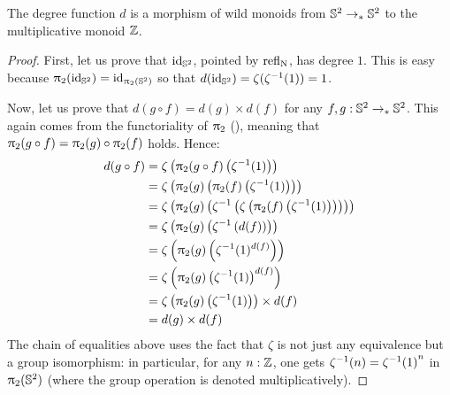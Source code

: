 \documentclass[english,a4paper]{lmcs}
\begin{document}
\begin{prop}
  The degree function $d$ is a morphism of wild monoids from ${{\mathbb S^{2}}} \to_\ast {{\mathbb S^{2}}}$
  to the multiplicative monoid $\mathbb{Z}$.
  \label{prop:deg-monoid-morphism}
\end{prop}
\begin{proof}
  First, let us prove that $\mathord{\mathrm{id}}_{{\mathbb S^{2}}}$, pointed by $\mathop{{\mathrm{refl}}_{\mathrm{N}}}$, has degree $1$.
  This is easy because $\uppi_{2}(\mathord{\mathrm{id}}_{{\mathbb S^{2}}}) = \mathord{\mathrm{id}}_{\uppi_{2}({{\mathbb S^{2}}})}$ so that $d(\mathord{\mathrm{id}}_{{\mathbb S^{2}}})
  = \zeta(\zeta^{-1}(1)) = 1$.

  Now, let us prove that $d(g\circ f) = d(g)\times d(f)$ for any $f,g:{{\mathbb S^{2}}}
  \to_\ast{{\mathbb S^{2}}}$. This again comes from the functoriality of $\uppi_{2}$
  (\cite[after Lem.\ 7.3.3 and before Def.\ 8.4.2]{HoTT}),
  meaning that $\uppi_{2}(g\circ f) = \uppi_{2}(g)\circ\uppi_{2}(f)$
  holds. Hence:
  \begin{align*}
    d(g\circ f) &= \zeta\left( \uppi_{2}(g\circ f)\left( \zeta^{-1}(1) \right) \right)
    \\
    &= \zeta\left( \uppi_{2}(g) \left( \uppi_{2}(f)\left( \zeta^{-1}(1) \right)
    \right) \right)
    \\
    &= \zeta\left( \uppi_{2}(g) \left( \zeta^{-1} \left( \zeta \left( \uppi_{2}(f)\left( \zeta^{-1}(1) \right)
    \right) \right) \right) \right)
    \\
    &= \zeta \left( \uppi_{2}(g) \left( \zeta^{-1} \left(d(f)\right) \right) \right)
    \\
    &= \zeta \left( \uppi_{2}(g) \left( \zeta^{-1}(1)^{d(f)} \right) \right)
    \\
    &= \zeta \left( \uppi_{2}(g) \left( \zeta^{-1}(1)\right)^{d(f)} \right)
    \\
    &= \zeta \left( \uppi_{2}(g) \left( \zeta^{-1}(1)\right) \right)\times d(f)
    \\
    &= d(g)\times d(f)
  \end{align*}
  The chain of equalities above uses the fact that $\zeta$ is not just any
  equivalence but a group isomorphism: in particular, for any $n:\mathbb{Z}$, one
  gets $\zeta^{-1}(n) = {\zeta^{-1}(1)}^n$ in $\uppi_{2}({{\mathbb S^{2}}})$ (where the group
  operation is denoted multiplicatively).
\end{proof}
\end{document}
